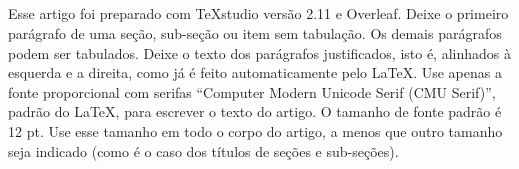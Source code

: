 \documentclass[12pt,letterpaper]{article}
\begin{document}
\subsection*{}
Esse artigo foi preparado com TeXstudio versão 2.11 e Overleaf. Deixe o primeiro parágrafo de uma seção, sub-seção ou item sem tabulação. Os demais parágrafos podem ser tabulados.  Deixe o texto dos parágrafos justificados, isto é, alinhados à esquerda e a direita, como já é feito automaticamente pelo LaTeX.    
Use apenas a fonte proporcional com serifas “Computer Modern Unicode Serif (CMU Serif)”, padrão do LaTeX, para escrever o texto do artigo.  O tamanho de fonte padrão é 12 pt.  Use esse tamanho em todo o corpo do artigo, a menos que outro tamanho seja indicado (como é o caso dos títulos de seções e sub-seções).

 
\end{document}
